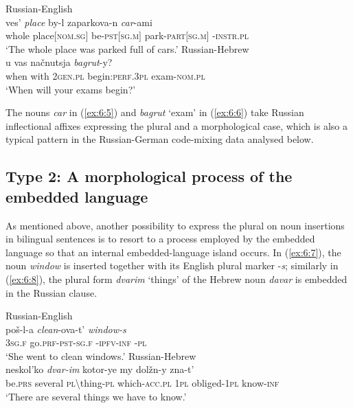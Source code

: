 \ea
\label{ex:6:5}
Russian-English \citep[173]{benson}\\
\gll ves' \textit{place} by-l zaparkova-n \textit{car}-ami\\
	whole place$[$\textsc{nom.sg}$]$ be-\textsc{pst}$[$\textsc{sg.m}$]$ park-\textsc{part$[$sg.m$]$} \phantom{mn}-\textsc{instr.pl}\\
\glt `The whole place was parked full of cars.'
\ex
\label{ex:6:6}
Russian-Hebrew \citep[48]{naiditch08}\\
 {u} {vas} {načnutsja} \textit{bagrut}-y?\\
	when with \textsc{2gen.pl} begin:\textsc{perf.3pl} exam-\textsc{nom.pl}\\
\glt `When will your exams begin?'
\z

\noindent The nouns \textit{car} in (\ref{ex:6:5}) and \textit{bagrut} `exam' in (\ref{ex:6:6}) take Russian inflectional affixes expressing the plural and a morphological case, which is also a typical pattern in the Russian-German code-mixing data analysed below.

\subsection{Type 2: A morphological process of the embedded language}

As mentioned above, another possibility to express the plural on noun insertions in bilingual sentences is to resort to a process employed by the embedded language so that an internal embedded-language island occurs. In (\ref{ex:6:7}), the noun \textit{window} is inserted together with its English plural marker -\textit{s}; similarly in (\ref{ex:6:8}), the plural form \textit{dvarim} `things' of the Hebrew noun \textit{davar} is embedded in the Russian clause.

\ea
\label{ex:6:7}
Russian-English \citep[173]{benson}\\
 {poš-l-a} \textit{clean}-ova-t' \textit{window-s}\\
	\textsc{3sg.f} go.\textsc{prf}-\textsc{pst-sg.f} \phantom{mmn}-\textsc{ipfv-inf} \phantom{mmmm}-\textsc{pl}\\
\glt `She went to clean windows.'
\ex
\label{ex:6:8}
Russian-Hebrew \citep[48]{naiditch08}\\
 {neskol'ko} \textit{dvar-im} {kotor-ye} {my} {dolžn-y} {zna-t'}\\
	be.\textsc{prs} several \textsc{pl}\textbackslash thing-\textsc{pl} which-\textsc{acc.pl} \textsc{1pl} obliged-\textsc{1pl} know-\textsc{inf}\\
\glt `There are several things we have to know.'
\z

